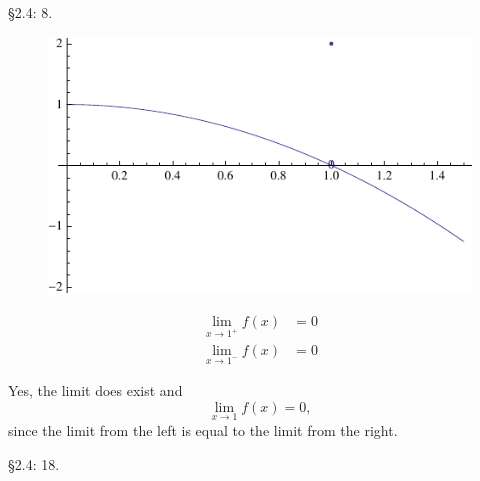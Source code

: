 \documentclass{hwset}
\begin{document}
\begin{problem}[4.]\S 2.4: 8.
\end{problem}
\be
\item
\begin{solution}
	\begin{figure}[H]
	\begin{center}
		\includegraphics{2_4_8.pdf} \\
	\end{center}
	\end{figure}
\end{solution}
\item
\begin{solution}
	\begin{align*}
		\lim_{x\to 1^+} f(x) &= \boxed{0} \\
		\lim_{x\to 1^-} f(x) &= \boxed{0} 
	\end{align*}
\end{solution}
\item
\begin{solution}
	Yes, the limit does exist and 
	\begin{equation*} \lim_{x\to 1} f(x) = \boxed{0,} \end{equation*}
	since the limit from the left is equal to the limit from the right.
\end{solution}
\ee

\begin{problem}[5.]\S 2.4: 18.
\end{problem}
\end{document}
